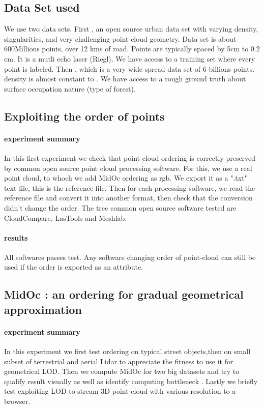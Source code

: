 	\subsection{Data Set used}
		We use two data sets.
		First , an open source urban data set with varying density, singularities, and very challenging point cloud geometry.
		Data set is about 600Millions points, over 12 kms of road. Points are typically spaced by 5cm to 0.2 cm. It is a mutli echo laser (Riegl).
		We have access to a training set where every point is labeled. 
		Then , which is a very wide spread data set of 6 billions points. density is almost constant to .
		We have access to a rough ground truth about surface occupation nature (type of forest).
		
	\subsection{Exploiting the order of points}
		\paragraph{experiment summary}
			In this first experiment we check that point cloud ordering is correctly preserved by common open source point cloud processing software.
			For this, we use a real point cloud, to whoch we add MidOc ordering as rgb. 
			We export it as a ".txt" text file, this is the reference file.
			Then for each processing software, we read the reference file and convert it into another format, then check that the conversion didn't change the order. 
			The tree common open source software tested are CloudCompare, LasTools and Meshlab.
		\paragraph{results}  
			All softwares passes test.
			Any software changing order of point-cloud can still be used if the order is exported as an attribute.
	\subsection{MidOc : an ordering for gradual geometrical approximation}
		\paragraph{experiment summary}
			In this experiment we first test ordering on typical street objects,then on small subset of terrestrial and aerial Lidar to appreciate the fitness to use it for geometrical LOD.
			Then we compute MidOc for two big datasets and try to qualify result visually as well as identify computing bottleneck .
			Lastly we briefly test exploiting LOD to stream 3D point cloud with various resolution to a browser.
		
